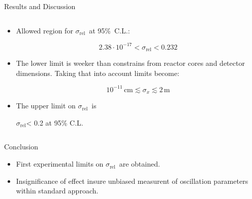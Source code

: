 \documentclass[usenames, dvipsnames]{beamer}
\newcommand{\Lcoh}{\ensuremath{L^{\text{coh}}}}
\newcommand{\Ld}{\ensuremath{L^{\text{d}}}}
\newcommand{\Important}{\textcolor{BrickRed}}
\newcommand{\impitem}{\item[\Important{$\bullet$}]}
\newcommand{\srel}{\ensuremath{\sigma_{\text{rel}}}}
\newcommand{\six}{\ensuremath{\sigma_x}}
\begin{document}
\begin{frame}[fragile]
\begin{columns}[T]
\begin{column}{.47\textwidth}
\begin{block}{Results and Discussion}
\begin{columns}[T]
\begin{column}{0.57\textwidth}
\begin{itemize}
\begin{itemize}
                    by \ensuremath{\text{D}^2}.
                    \item \Important{$10^{-16} < \srel < 0.1$} -- no impact on
                    oscillations.
                    \item \Important{$\srel > 0.1$} -- loss of coherence
                    due to spacial separation
                    \Important{\Lcoh} and dispersion \Important{\Ld}.
                \end{itemize}
                \impitem Allowed region for \srel\, at 95\%~C.L.:
                \begin{center}
                    \colorbox{OliveGreen!20}{
                    \begin{equation*}
                        2.38 \cdot 10^{-17} < \srel < 0.232
                    \end{equation*}}
                \end{center}
                \impitem The lower limit is weeker than constrains from reactor cores and detector
                dimensions. Taking that into account limits become:
                \begin{center}
                    \colorbox{OliveGreen!20}{
                    \begin{equation*}
                        10^{-11}\, \text{cm} \lesssim \six \lesssim 2\, \text{m}
                    \end{equation*}}
                \end{center}
                \impitem The upper limit on \srel\, is
                \begin{center}
                    \colorbox{OliveGreen!20}{\srel < 0.2 at 95\% C.L.}
                \end{center}
            \end{itemize}
        \end{column}
    \end{columns}
\end{block}

\begin{block}{Conclusion}
    \begin{itemize}
        \impitem First experimental limits on \srel\, are obtained.
        \impitem Insignificance of effect insure unbiased measurent of oscillation
        parameters within standard approach.
    \end{itemize}
\end{block}

\end{column}

\end{columns}

\end{frame}
\end{document}

